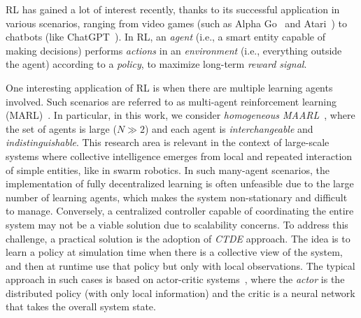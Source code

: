  \Ac{RL} has gained a lot of interest recently, 
 thanks to its successful application in various scenarios, 
 ranging from video games (such as Alpha Go~\cite{Silver2016Go} and Atari~\cite{mnih2015playing}) 
 to chatbots (like ChatGPT~\cite{ChatGPT2023}). 
% 
In \ac{RL}, an \emph{agent} (i.e., a smart entity capable of making decisions) 
 performs \emph{actions} in an \emph{environment} (i.e., everything outside the agent) according to a \emph{policy}, 
 to maximize long-term \emph{reward signal}. %

One interesting application of \ac{RL} is when there are multiple learning agents involved. 
 Such scenarios are referred to as multi-agent reinforcement learning (MARL)~\cite{zhang2019marl}. 
%
In particular, in this work, we consider \emph{homogeneous \ac{MAARL}}~\cite{yang2021many}, 
 where the set of agents is large ($N \gg 2$) and each agent is \emph{interchangeable} and \emph{indistinguishable}.
%
This research area is relevant in the context of large-scale systems 
 where collective intelligence emerges from local and repeated interaction of simple entities, like in swarm robotics.
%
In such many-agent scenarios, 
 the implementation of fully decentralized learning is often unfeasible due to the large number of learning agents, 
 which makes the system non-stationary and difficult to manage. 
%
Conversely, a centralized controller capable of coordinating 
 the entire system may not be a viable solution due to scalability concerns. 
 To address this challenge, a practical solution is the adoption of \emph{\ac{CTDE}} approach.
%
The idea is to learn a policy at simulation time when there is a collective view of the system, 
 and then at runtime use that policy but only with local observations. 
%
The typical approach in such cases is based on actor-critic systems~\cite{DBLP:conf/nips/LoweWTHAM17,wu2022more,song2022ctds,song2022centralized},
  where the \emph{actor} is the distributed policy (with only local information) and the critic is a neural network that takes the overall system state.
%
